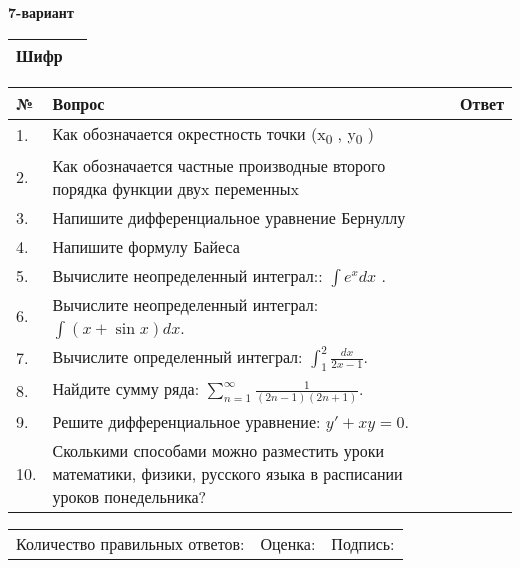 \documentclass{article}
\begin{document}
  \egroup
  
  \newpage
  
  
  \textbf{7-вариант}\\
  
  \bgroup
  \def\arraystretch{1.6} %
  
  \begin{tabular}{|m{5.7cm}|m{9.5cm}|}
  \hline
  Шифр & \\
  \hline
  \end{tabular}
  
  \vspace{1cm}
  
  \begin{tabular}{|m{0.7cm}|m{10cm}|m{4cm}|}
  \hline
  № & Вопрос & Ответ \\
  \hline
  1. & Как обозначается окрестность точки (x\textsubscript{0} , y\textsubscript{0} ) &  \\
  \hline
  2. & Как обозначается частные производные второго порядка функции двуx переменныx &  \\
  \hline
  3. & Напишите дифференциальное уравнение Бернуллу &  \\
  \hline
  4. & Напишите формулу Байеса &  \\
  \hline
  5. & Вычислите неопределенный интеграл:: \(\int{e^{x}dx}\) . &  \\
  \hline
  6. & Вычислите неопределенный интеграл: \(\int{(x + \sin x)}dx\). &  \\
  \hline
  7. & Вычислите определенный интеграл: \(\int_{1}^{2}\frac{dx}{2x -1}\). &  \\
  \hline
  8. & Найдите сумму ряда: \(\sum_{n = 1}^{\infty}\frac{1}{(2n - 1)(2n + 1)}\). &  \\
  \hline
  9. & Решите дифференциальное уравнение: \(y' + xy = 0\). &  \\
  \hline
  10. & Сколькими способами можно разместить уроки математики, физики, русского языка в расписании уроков понедельника? &  \\
  \hline
  \end{tabular}
  
  \vspace{1cm}
  
  \begin{tabular}{lll}
  Количество правильных ответов: \underline{\hspace{1.5cm}} & 
  Оценка: \underline{\hspace{1.5cm}} & 
  Подпись: \underline{\hspace{2cm}} \\
  \end{tabular}
  
\end{document}
